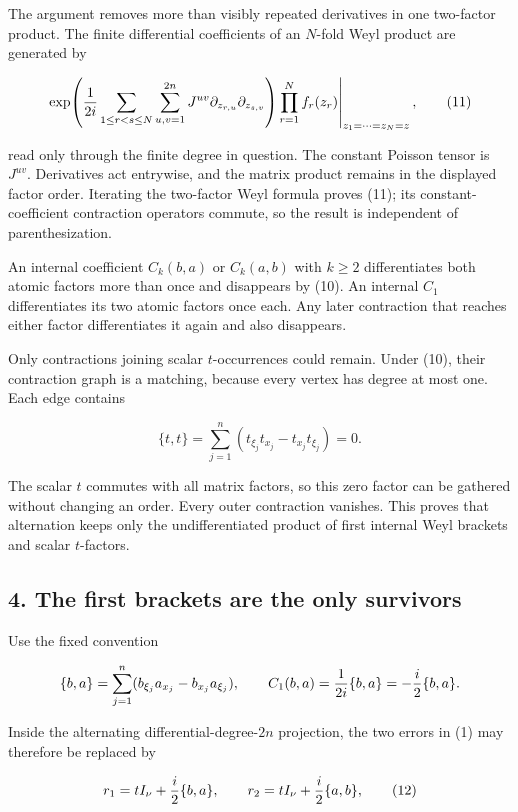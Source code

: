\documentclass[
  11pt,
]{article}
\begin{document}
The argument removes more than visibly repeated derivatives in one
two-factor product. The finite differential coefficients of an
\(N\)-fold Weyl product are generated by

\[
 \left.
 \exp\!\left({1\over2i}
  \sum_{1\le r<s\le N}\sum_{u,v=1}^{2n}
    J^{uv}\partial_{z_{r,u}}\partial_{z_{s,v}}
 \right)
 \prod_{r=1}^{N}f_r(z_r)
 \right|_{z_1=\cdots=z_N=z},
 \tag{11}
\]

read only through the finite degree in question. The constant Poisson
tensor is \(J^{uv}\). Derivatives act entrywise, and the matrix product
remains in the displayed factor order. Iterating the two-factor Weyl
formula proves (11); its constant-coefficient contraction operators
commute, so the result is independent of parenthesization.

An internal coefficient \(C_k(b,a)\) or \(C_k(a,b)\) with \(k\geq2\)
differentiates both atomic factors more than once and disappears by
(10). An internal \(C_1\) differentiates its two atomic factors once
each. Any later contraction that reaches either factor differentiates it
again and also disappears.

Only contractions joining scalar \(t\)-occurrences could remain. Under
(10), their contraction graph is a matching, because every vertex has
degree at most one. Each edge contains

\[
 \{t,t\}=\sum_{j=1}^{n}
  (t_{\xi_j}t_{x_j}-t_{x_j}t_{\xi_j})=0.
\]

The scalar \(t\) commutes with all matrix factors, so this zero factor
can be gathered without changing an order. Every outer contraction
vanishes. This proves that alternation keeps only the undifferentiated
product of first internal Weyl brackets and scalar \(t\)-factors.

\subsection{4. The first brackets are the only
survivors}\label{the-first-brackets-are-the-only-survivors}

Use the fixed convention

\[
 \{b,a\}=\sum_{j=1}^{n}
  (b_{\xi_j}a_{x_j}-b_{x_j}a_{\xi_j}),
 \qquad
 C_1(b,a)={1\over2i}\{b,a\}=-{i\over2}\{b,a\}.
\]

Inside the alternating differential-degree-\(2n\) projection, the two
errors in (1) may therefore be replaced by

\[
 r_1=tI_\nu+{i\over2}\{b,a\},
 \qquad
 r_2=tI_\nu+{i\over2}\{a,b\},
 \tag{12}
\]
\end{document}

